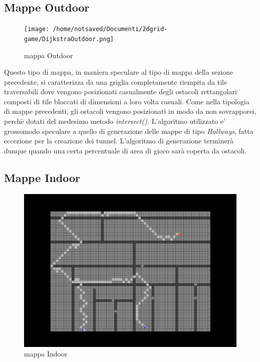 \documentclass[12pt]{book}
\begin{document}
{{\begin{minipage}{\linewidth}
\begin{algorithm}[H]
\end{algorithm}
\end{minipage}
}


\subsection{Mappe Outdoor}
\begin{figure}[h]
\centering
\texttt{[image: /home/notsaved/Documenti/2dgrid-game/DijkstraOutdoor.png]}
\caption{mappa Outdoor}
\label{img2}
\end{figure}
Questo tipo di mappa, in maniera speculare al tipo di mappa della sezione precedente, si caratterizza da una griglia completamente riempita da tile traversabili dove vengono posizionati casualmente degli ostacoli rettangolari composti di tile bloccati di dimensioni a loro volta casuali.
Come nella tipologia di mappe precedenti, gli ostacoli vengono posizionati in modo da non sovrapporsi, perch\`e dotati del medesimo metodo \emph{intersect()}. L'algoritmo utilizzato e' grossomodo speculare a quello di generazione delle mappe di tipo \emph{Hallways}, fatta eccezione per la creazione dei tunnel. L'algoritmo di generazione terminer\`a dunque quando una certa percentuale di area di gioco sar\`a coperta da ostacoli.
\subsection{Mappe Indoor}
\begin{figure}[H]
\centering
\includegraphics[scale=0.30]{../DijkstraIndoor.png}
\caption{mappa Indoor}
\label{img3}
\end{figure}

}
\end{document}
